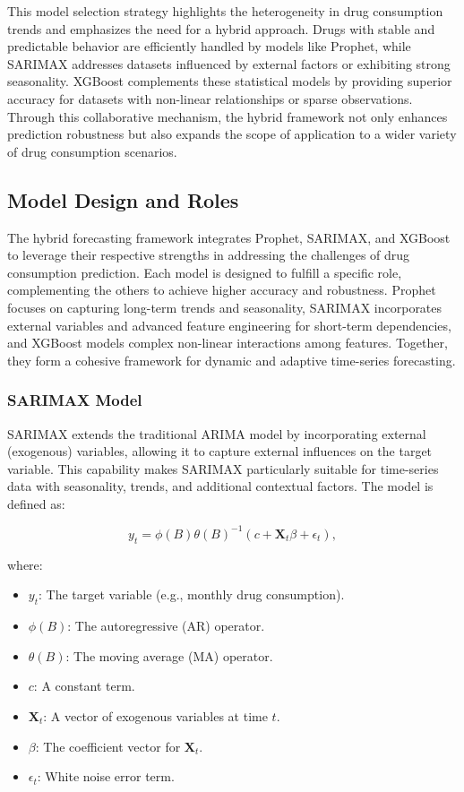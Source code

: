 \documentclass[journal]{IEEEtran}
\begin{document}
This model selection strategy highlights the heterogeneity in drug consumption trends and emphasizes the need for a hybrid approach. Drugs with stable and predictable behavior are efficiently handled by models like Prophet, while SARIMAX addresses datasets influenced by external factors or exhibiting strong seasonality. XGBoost complements these statistical models by providing superior accuracy for datasets with non-linear relationships or sparse observations. Through this collaborative mechanism, the hybrid framework not only enhances prediction robustness but also expands the scope of application to a wider variety of drug consumption scenarios.



\subsection{Model Design and Roles}

The hybrid forecasting framework integrates Prophet, SARIMAX, and XGBoost to leverage their respective strengths in addressing the challenges of drug consumption prediction. Each model is designed to fulfill a specific role, complementing the others to achieve higher accuracy and robustness. Prophet focuses on capturing long-term trends and seasonality, SARIMAX incorporates external variables and advanced feature engineering for short-term dependencies, and XGBoost models complex non-linear interactions among features. Together, they form a cohesive framework for dynamic and adaptive time-series forecasting.

\subsubsection{SARIMAX Model}

SARIMAX extends the traditional ARIMA model by incorporating external (exogenous) variables, allowing it to capture external influences on the target variable. This capability makes SARIMAX particularly suitable for time-series data with seasonality, trends, and additional contextual factors. The model is defined as:

\begin{equation}
y_{t} = \phi(B)\theta(B)^{-1} \left( c + \mathbf{X}_{t}\beta + \epsilon_{t} \right),
\end{equation}

where:
\begin{itemize}
    \item \(y_{t}\): The target variable (e.g., monthly drug consumption).
    \item \(\phi(B)\): The autoregressive (AR) operator.
    \item \(\theta(B)\): The moving average (MA) operator.
    \item \(c\): A constant term.
    \item \(\mathbf{X}_{t}\): A vector of exogenous variables at time \(t\).
    \item \(\beta\): The coefficient vector for \(\mathbf{X}_{t}\).
    \item \(\epsilon_{t}\): White noise error term.
\end{itemize}
\end{document}
